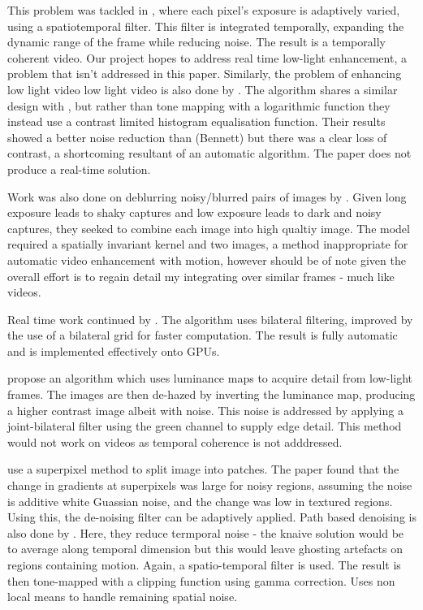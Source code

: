 \documentclass[12pt,a4paper]{article}
\begin{document}
	This problem was tackled in \cite{Bennett:2005:VEU:1073204.1073272}, where each pixel's exposure is adaptively varied, using a spatiotemporal filter. This filter is integrated temporally, expanding the dynamic range of the frame while reducing noise. The result is a temporally coherent video. Our project hopes to address real time low-light enhancement, a problem that isn't addressed in this paper. Similarly, the problem of enhancing low light video low light video is also done by \cite{malm2007adaptive}. The algorithm shares a similar design with \cite{Bennett:2005:VEU:1073204.1073272}, but rather than tone mapping with a logarithmic function they instead use a contrast limited histogram equalisation function. Their results showed a better noise reduction than (Bennett) but there was a clear loss of contrast, a shortcoming resultant of an automatic algorithm. The paper does not produce a real-time solution.

	Work was also done on deblurring noisy/blurred pairs of images by \cite{Yuan:2007:IDB:1276377.1276379}. Given long exposure leads to shaky captures and low exposure leads to dark and noisy captures, they seeked to combine each image into high qualtiy image. The model required a spatially invariant kernel and two images, a method inappropriate for automatic video enhancement with motion, however should be of note given the overall effort is to regain detail my integrating over similar frames - much like videos.

	Real time work continued by \cite{Kovaleski2009}. The algorithm uses bilateral filtering, improved by the use of a bilateral grid for faster computation. The result is fully automatic and is implemented effectively onto GPUs.

	\cite{6460559} propose an algorithm which uses luminance maps to acquire detail from low-light frames. The images are then de-hazed by inverting the luminance map, producing a higher contrast image albeit with noise. This noise is addressed by applying a joint-bilateral filter using the green channel to supply edge detail. This method would not work on videos as temporal coherence is not adddressed.

	\cite{li2015low} use a superpixel method to split image into patches. The paper found that the change in gradients at superpixels was large for noisy regions, assuming the noise is additive white Guassian noise, and the change was low in textured regions. Using this, the de-noising filter can be adaptively applied. Path based denoising is also done by \cite{kim2015novel}. Here, they reduce termporal noise - the knaive solution would be to average along temporal dimension but this would leave ghosting artefacts on regions containing motion. Again, a spatio-temporal filter is used. The result is then tone-mapped with a clipping function using gamma correction. Uses non local means to handle remaining spatial noise.

	






 












\end{document}
